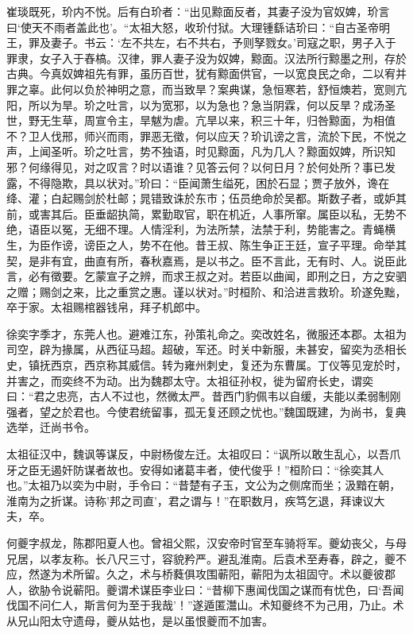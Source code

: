 \documentclass[12pt,UTF8]{ctexbook}
\begin{document}
崔琰既死，玠内不悦。后有白玠者：“出见黥面反者，其妻子没为官奴婢，玠言曰‘使天不雨者盖此也’。“太祖大怒，收玠付狱。大理锺繇诘玠曰：“自古圣帝明王，罪及妻子。书云：‘左不共左，右不共右，予则孥戮女。’司寇之职，男子入于罪隶，女子入于舂槁。汉律，罪人妻子没为奴婢，黥面。汉法所行黥墨之刑，存於古典。今真奴婢祖先有罪，虽历百世，犹有黥面供官，一以宽良民之命，二以宥并罪之辜。此何以负於神明之意，而当致旱？案典谋，急恒寒若，舒恒燠若，宽则亢阳，所以为旱。玠之吐言，以为宽邪，以为急也？急当阴霖，何以反旱？成汤圣世，野无生草，周宣令主，旱魃为虐。亢旱以来，积三十年，归咎黥面，为相值不？卫人伐邢，师兴而雨，罪恶无徵，何以应天？玠讥谤之言，流於下民，不悦之声，上闻圣听。玠之吐言，势不独语，时见黥面，凡为几人？黥面奴婢，所识知邪？何缘得见，对之叹言？时以语谁？见答云何？以何日月？於何处所？事已发露，不得隐欺，具以状对。”玠曰：“臣闻萧生缢死，困於石显；贾子放外，谗在绛、灌；白起赐剑於杜邮；晁错致诛於东市；伍员绝命於吴都。斯数子者，或妒其前，或害其后。臣垂龆执简，累勤取官，职在机近，人事所窜。属臣以私，无势不绝，语臣以冤，无细不理。人情淫利，为法所禁，法禁于利，势能害之。青蝇横生，为臣作谤，谤臣之人，势不在他。昔王叔、陈生争正王廷，宣子平理。命举其契，是非有宜，曲直有所，春秋嘉焉，是以书之。臣不言此，无有时、人。说臣此言，必有徵要。乞蒙宣子之辨，而求王叔之对。若臣以曲闻，即刑之日，方之安驷之赠；赐剑之来，比之重赏之惠。谨以状对。”时桓阶、和洽进言救玠。玠遂免黜，卒于家。太祖赐棺器钱帛，拜子机郎中。

徐奕字季才，东莞人也。避难江东，孙策礼命之。奕改姓名，微服还本郡。太祖为司空，辟为掾属，从西征马超。超破，军还。时关中新服，未甚安，留奕为丞相长史，镇抚西京，西京称其威信。转为雍州刺史，复还为东曹属。丁仪等见宠於时，并害之，而奕终不为动。出为魏郡太守。太祖征孙权，徙为留府长史，谓奕曰：“君之忠亮，古人不过也，然微太严。昔西门豹佩韦以自缓，夫能以柔弱制刚强者，望之於君也。今使君统留事，孤无复还顾之忧也。”魏国既建，为尚书，复典选举，迁尚书令。

太祖征汉中，魏讽等谋反，中尉杨俊左迁。太祖叹曰：“讽所以敢生乱心，以吾爪牙之臣无遏奸防谋者故也。安得如诸葛丰者，使代俊乎！”桓阶曰：“徐奕其人也。”太祖乃以奕为中尉，手令曰：“昔楚有子玉，文公为之侧席而坐；汲黯在朝，淮南为之折谋。诗称'邦之司直'，君之谓与！”在职数月，疾笃乞退，拜谏议大夫，卒。

何夔字叔龙，陈郡阳夏人也。曾祖父熙，汉安帝时官至车骑将军。夔幼丧父，与母兄居，以孝友称。长八尺三寸，容貌矜严。避乱淮南。后袁术至寿春，辟之，夔不应，然遂为术所留。久之，术与桥蕤俱攻围蕲阳，蕲阳为太祖固守。术以夔彼郡人，欲胁令说蕲阳。夔谓术谋臣李业曰：“昔柳下惠闻伐国之谋而有忧色，曰‘吾闻伐国不问仁人，斯言何为至于我哉’！”遂遁匿灊山。术知夔终不为己用，乃止。术从兄山阳太守遗母，夔从姑也，是以虽恨夔而不加害。
\end{document}
